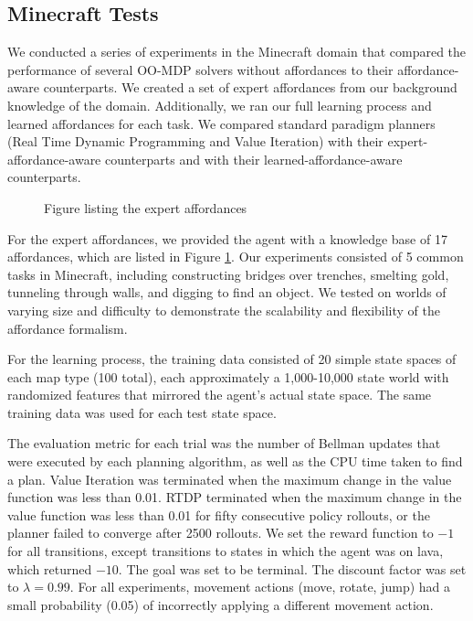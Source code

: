 \documentclass[conference]{IEEEtran}
\begin{document}
\subsection{Minecraft Tests}
We conducted a series of experiments in the Minecraft domain that
compared the performance of several OO-MDP solvers without affordances
to their affordance-aware counterparts. We created a set of expert
affordances from our background knowledge of the domain. Additionally, we ran our full
learning process and learned affordances for each
task. We compared standard paradigm planners (Real Time Dynamic
Programming and Value Iteration) with their expert-affordance-aware
counterparts and with their learned-affordance-aware counterparts.

\begin{figure}
Figure listing the expert affordances
\label{fig:afford_kb_exp}
\end{figure}

For the expert affordances, we provided the agent with a knowledge base of 17 affordances,
which are listed in Figure \ref{fig:afford_kb_exp}.  Our experiments
consisted of 5 common tasks in Minecraft, including
constructing bridges over trenches, smelting gold, tunneling
through walls, and digging to find an object.  We tested on worlds of varying size
and difficulty to demonstrate the scalability and flexibility of the
affordance formalism.

For the learning process, the training data consisted of 20 simple state
spaces of each map type (100 total), each approximately a 1,000-10,000 state
world with randomized features that mirrored the agent's actual state space. 
The same training data was used for each test state space.

The evaluation metric for each trial was the
number of Bellman updates that were executed by each planning
algorithm, as well as the CPU time taken to find a plan. Value Iteration was terminated when the maximum change in
the value function was less than 0.01. RTDP terminated when the
maximum change in the value function was less than 0.01 for fifty
consecutive policy rollouts, or the planner failed to converge after 2500 rollouts.
We set the reward function to $-1$ for all transitions, except
transitions to states in which the agent was on lava, which returned 
$-10$. The goal was set to be terminal. The discount
factor was set to $\lambda = 0.99$. For all experiments, movement actions
(move, rotate, jump) had a small probability (0.05) of incorrectly applying a different movement action.
\end{document}
